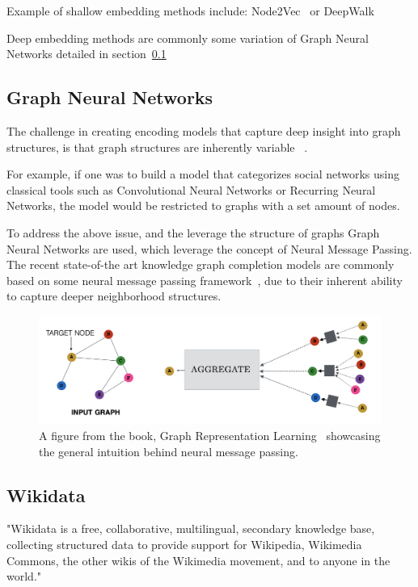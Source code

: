Example of shallow embedding methods include: Node2Vec~\cite{Node2vec} or DeepWalk~\cite{DeepWalk}

Deep embedding methods are commonly some variation of Graph Neural Networks detailed in section~\ref{subsec:introduction-graph-neural-networks}

\subsection{Graph Neural Networks}\label{subsec:introduction-graph-neural-networks}
The challenge in creating encoding models that capture deep insight into graph structures, is that graph structures are inherently variable ~\cite{GRLBook}.

For example, if one was to build a model that categorizes social networks using classical tools such as Convolutional Neural Networks or Recurring Neural Networks,
the model would be restricted to graphs with a set amount of nodes.

To address the above issue, and the leverage the structure of graphs Graph Neural Networks are used, which leverage the concept of Neural Message Passing.
The recent state-of-the art knowledge graph completion models are commonly based on some neural message passing framework~\cite{LPSOTA}, due to their inherent ability to capture
deeper neighborhood structures.

\begin{figure}[h] %
    \centering %
    \includegraphics[width=0.9\linewidth]{figures/gnn} %
    \caption{A figure from the book, Graph Representation Learning~\cite{GRLBook} showcasing the general intuition behind neural message passing.} %
    \label{fig:gnn} %
\end{figure}


\subsection{Wikidata}\label{subsec:introduction-wikidata}
"Wikidata is a free, collaborative, multilingual, secondary knowledge base, collecting structured data to provide support for Wikipedia, Wikimedia Commons, the other wikis of the Wikimedia movement,
and to anyone in the world."

